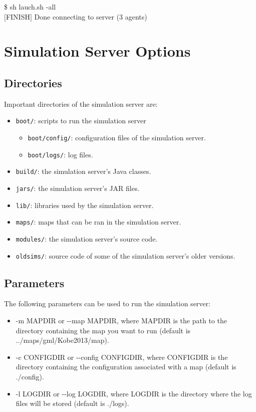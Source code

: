 \documentclass{article}
\begin{document}
\begin{center}
   \begin{tcolorbox}[title=Running Sample Agents, width=.98\linewidth]
    {\ttfamily
    \$ sh lauch.sh -all\\
    $[$FINISH$]$ Done connecting to server (3 agents)
    }
  \end{tcolorbox}
\end{center}

\section{Simulation Server Options}
\subsection{Directories}
Important directories of the simulation server are:
\begin{itemize}
 \item \texttt{boot/}: scripts to run the simulation server
       \begin{itemize}
         \item \texttt{boot/config/}: configuration files of the simulation server.
         \item \texttt{boot/logs/}: log files.
       \end{itemize}
 \item \texttt{build/}: the simulation server's Java classes.
 \item \texttt{jars/}: the simulation server's JAR files.
 \item \texttt{lib/}: libraries used by the simulation server.
 \item \texttt{maps/}: maps that can be ran in the simulation server.
 \item \texttt{modules/}: the simulation server's source code.
 \item \texttt{oldsims/}: source code of some of the simulation server's older versions.
\end{itemize}
\subsection{Parameters}
The following parameters can be used to run the simulation server:
\begin{itemize}
  \item -m MAPDIR or {-}{-}map MAPDIR, where MAPDIR is the path to the directory containing the map you want to run (default is ../maps/gml/Kobe2013/map).
  \item -c CONFIGDIR or {-}{-}config CONFIGDIR, where CONFIGDIR is the directory containing the configuration associated with a map (default is ./config).
  \item -l LOGDIR or {-}{-}log LOGDIR, where LOGDIR is the directory where the log files will be stored (default is ./logs).
\end{itemize}
\end{document}
